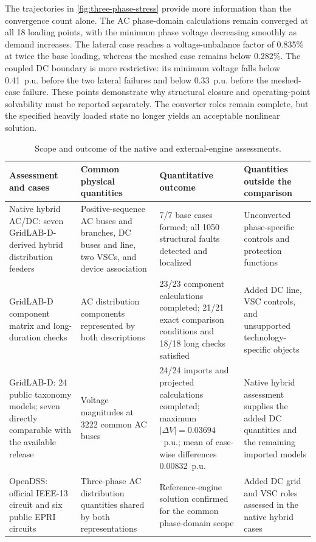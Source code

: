 The trajectories in \cref{fig:three-phase-stress} provide more information
than the convergence count alone. The AC phase-domain calculations remain
converged at all 18 loading points, with the minimum phase voltage decreasing
smoothly as demand increases. The lateral case reaches a voltage-unbalance
factor of 0.835\% at twice the base loading, whereas the meshed case remains
below 0.282\%. The coupled DC boundary is more restrictive: its minimum voltage
falls below 0.41~p.u. before the two lateral failures and below 0.33~p.u. before
the meshed-case failure. These points demonstrate why structural closure and
operating-point solvability must be reported separately. The converter roles
remain complete, but the specified heavily loaded state no longer yields an
acceptable nonlinear solution.

\begin{table}[t]
\centering
\caption{Scope and outcome of the native and external-engine assessments.}
\label{tab:external-scope}
\footnotesize
\begin{tabularx}{\textwidth}{@{}p{}p{}p{}X@{}}
\toprule
Assessment and cases & Common physical quantities & Quantitative outcome & Quantities outside the comparison\\
\midrule
Native hybrid AC/DC: seven GridLAB-D-derived hybrid distribution feeders & Positive-sequence AC buses and branches, DC buses and line, two VSCs, and device association & 7/7 base cases formed; all 1050 structural faults detected and localized & Unconverted phase-specific controls and protection functions\\
GridLAB-D component matrix and long-duration checks & AC distribution components represented by both descriptions & 23/23 component calculations completed; 21/21 exact comparison conditions and 18/18 long checks satisfied & Added DC line, VSC controls, and unsupported technology-specific objects\\
GridLAB-D: 24 public taxonomy models; seven directly comparable with the available release & Voltage magnitudes at 3222 common AC buses & 24/24 imports and projected calculations completed; maximum $|\Delta V|=0.03694$~p.u.; mean of case-wise differences 0.00832~p.u. & Native hybrid assessment supplies the added DC quantities and the remaining imported models\\
OpenDSS: official IEEE-13 circuit and six public EPRI circuits & Three-phase AC distribution quantities shared by both representations & Reference-engine solution confirmed for the common phase-domain scope & Added DC grid and VSC roles assessed in the native hybrid cases\\
\bottomrule
\end{tabularx}
\end{table}

